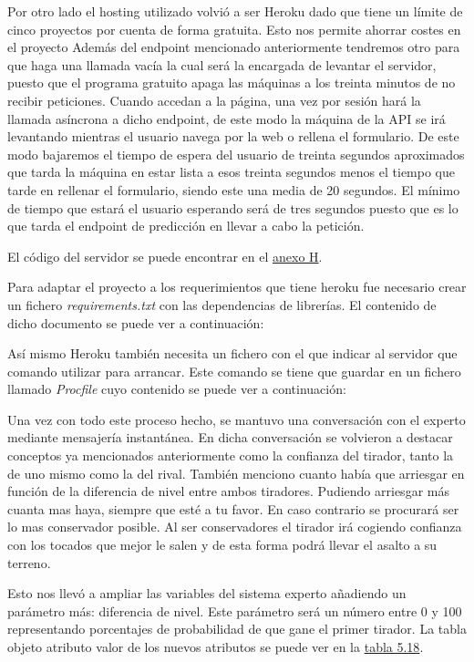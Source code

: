Por otro lado el hosting utilizado volvió a ser Heroku dado que tiene un límite de cinco
proyectos por cuenta de forma gratuita. Esto nos permite ahorrar costes en el proyecto
Además del endpoint mencionado anteriormente tendremos otro para que haga una llamada vacía
la cual será la encargada de levantar el servidor, puesto que el programa gratuito apaga
las máquinas a los treinta minutos de no recibir peticiones. Cuando accedan a la página, una
vez por sesión hará la llamada asíncrona a dicho endpoint, de este modo la máquina de la API
se irá levantando mientras el usuario navega por la web o rellena el formulario. De este modo
bajaremos el tiempo de espera del usuario de treinta segundos aproximados que tarda la máquina en
estar lista a esos treinta segundos menos el tiempo que tarde en rellenar el formulario, siendo
este una media de 20 segundos. El mínimo de tiempo que estará el usuario esperando será de tres
segundos puesto que es lo que tarda el endpoint de predicción en llevar a cabo la petición.


El código del servidor se puede encontrar en el \hyperref[cap:Codigo servidor API]{anexo H}.


Para adaptar el proyecto a los requerimientos que tiene heroku fue necesario crear un fichero
\textit{requirements.txt} con las dependencias de librerías. El contenido de dicho documento
se puede ver a continuación:



Así mismo Heroku también necesita un fichero con el que indicar al servidor que comando
utilizar para arrancar. Este comando se tiene que guardar en un fichero llamado
\textit{Procfile} cuyo contenido se puede ver a continuación:



Una vez con todo este proceso hecho, se mantuvo una conversación con el experto mediante mensajería
instantánea. En dicha conversación se volvieron a destacar conceptos ya mencionados anteriormente
como la confianza del tirador, tanto la de uno mismo como la del rival. También menciono cuanto
había que arriesgar en función de la diferencia de nivel entre ambos tiradores. Pudiendo
arriesgar más cuanta mas haya, siempre que esté a tu favor. En caso contrario se procurará ser
lo mas conservador posible. Al ser conservadores el tirador irá cogiendo confianza con los
tocados que mejor le salen y de esta forma podrá llevar el asalto a su terreno.

Esto nos llevó a ampliar las variables del sistema experto añadiendo un parámetro más: diferencia
de nivel. Este parámetro será un número entre 0 y 100 representando porcentajes de probabilidad
de que gane el primer tirador. La tabla objeto atributo valor de los nuevos atributos se puede
ver en la \hyperref[tab:Tabla objeto atributo y valor victoria]{tabla 5.18}.

